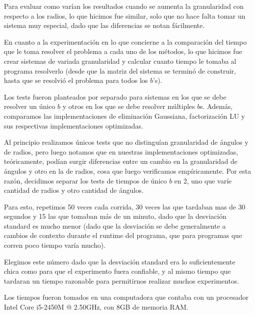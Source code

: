Para evaluar como varían los resultados cuando se aumenta la granularidad con respecto a los radios, lo que hicimos fue similar, solo que no hace falta tomar un sistema muy especial, dado que las diferencias se notan fácilmente.

En cuanto a la experimentación en lo que concierne a la comparación del tiempo que le toma resolver el problema a cada uno de los métodos, lo que hicimos fue crear sistemas de variada granularidad y calcular cuanto tiempo le tomaba al programa resolverlo (desde que la matriz del sistema se terminó de construir, hasta que se resolvió el problema para todos los $b$'s).

Los tests fueron planteados por separado para sistemas en los que se debe resolver un único $b$ y otros en los que se debe resolver múltiples $b$s. Además, comparamos las implementaciones de eliminación Gaussiana, factorización LU y sus respectivas implementaciones optimizadas.

Al principio realizamos únicos tests que no distinguían granularidad de ángulos y de radios, pero luego notamos que en nuestras implementaciones optimizadas, teóricamente, podían surgir diferencias entre un cambio en la granularidad de ángulos y otro en la de radios, cosa que luego verificamos empíricamente. Por esta razón, decidimos separar los tests de tiempos de único $b$ en 2, uno que varíe cantidad de radios y otro cantidad de ángulos.


Para esto, repetimos 50 veces cada corrida, 30 veces las que tardaban mas de 30 segundos y 15 las que tomaban más de un minuto, dado que la desviación standard es mucho menor (dado que la desviación se debe generalmente a cambios de contexto durante el runtime del programa, que para programas que corren poco tiempo varía mucho).

Elegimos este número dado que la desviación standard era lo suficientemente chica como para que el experimento fuera confiable, y al mismo tiempo que tardaran un tiempo razonable para permitirnos realizar muchos experimentos.

Los tiempos fueron tomados en una computadora que contaba con un procesador Intel Core i5-2450M @ 2.50GHz, con 8GB de memoria RAM.
